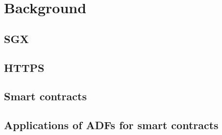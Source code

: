 \section{Background}
\subsection{SGX}
\subsection{HTTPS}
\subsection{Smart contracts}
\subsection{Applications of ADFs for smart contracts}
